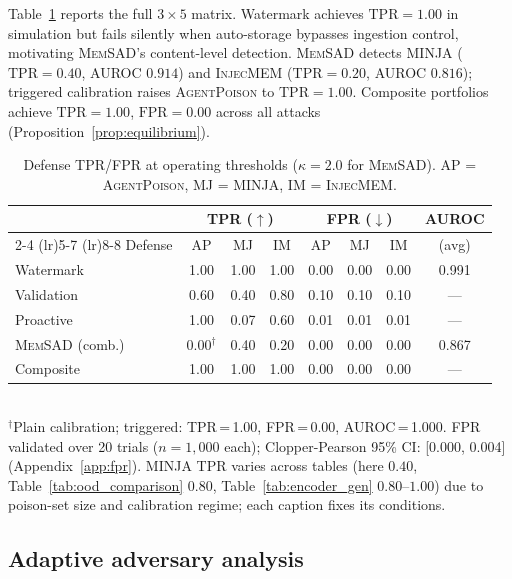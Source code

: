 \documentclass{article}
\theoremstyle{definition}
\newcommand{\tpr}{\text{TPR}}
\newcommand{\fpr}{\text{FPR}}
\newcommand{\memsad}{\textnormal{\textsc{MemSAD}}}
\newcommand{\agentpoison}{\textsc{AgentPoison}}
\newcommand{\minja}{\textsc{MINJA}}
\newcommand{\injecmem}{\textsc{InjecMEM}}
\begin{document}
Table~\ref{tab:defense_tpr_fpr} reports the full $3 \times 5$ matrix.
Watermark achieves $\tpr = 1.00$ in simulation but fails silently when auto-storage bypasses ingestion control, motivating \memsad{}'s content-level detection.
\memsad{} detects \minja{} ($\tpr = 0.40$, AUROC $0.914$) and \injecmem{} ($\tpr = 0.20$, AUROC $0.816$); triggered calibration raises \agentpoison{} to $\tpr = 1.00$.
Composite portfolios achieve $\tpr = 1.00$, $\fpr = 0.00$ across all attacks (Proposition~\ref{prop:equilibrium}).

\begin{table}[t]
  \centering
  \small
  \caption{Defense TPR/FPR at operating thresholds ($\kappa = 2.0$ for \memsad{}). AP = \agentpoison{}, MJ = \minja{}, IM = \injecmem{}.}
  \label{tab:defense_tpr_fpr}
  \vspace{2pt}
  \begin{tabular}{l ccc ccc c}
    \toprule
    & \multicolumn{3}{c}{TPR ($\uparrow$)} & \multicolumn{3}{c}{FPR ($\downarrow$)} & AUROC \\
    \cmidrule(lr){2-4} \cmidrule(lr){5-7} \cmidrule(lr){8-8}
    Defense & AP & MJ & IM & AP & MJ & IM & (avg) \\
    \midrule
    Watermark   & 1.00 & 1.00 & 1.00 & 0.00 & 0.00 & 0.00 & 0.991 \\
    Validation  & 0.60 & 0.40 & 0.80 & 0.10 & 0.10 & 0.10 & --- \\
    Proactive   & 1.00 & 0.07 & 0.60 & 0.01 & 0.01 & 0.01 & --- \\
    \memsad{} (comb.)  & 0.00$^\dagger$ & 0.40 & 0.20 & 0.00 & 0.00 & 0.00 & 0.867 \\
    Composite   & 1.00 & 1.00 & 1.00 & 0.00 & 0.00 & 0.00 & --- \\
    \bottomrule
  \end{tabular}
  \\[2pt]
  {\footnotesize $^\dagger$Plain calibration; triggered: TPR\,=\,1.00, FPR\,=\,0.00, AUROC\,=\,1.000. FPR validated over 20 trials ($n = 1{,}000$ each); Clopper-Pearson 95\% CI: [0.000, 0.004] (Appendix~\ref{app:fpr}). \minja{} TPR varies across tables (here $0.40$, Table~\ref{tab:ood_comparison} $0.80$, Table~\ref{tab:encoder_gen} $0.80$--$1.00$) due to poison-set size and calibration regime; each caption fixes its conditions.}
  \vspace{-8pt}
\end{table}

\subsection{Adaptive adversary analysis}
\label{sec:adaptive_adversary}
\end{document}
